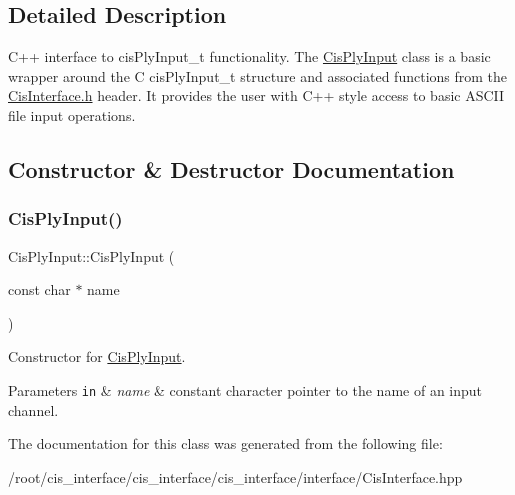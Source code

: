 \subsection{Detailed Description}
C++ interface to cis\+Ply\+Input\+\_\+t functionality. The \mbox{\hyperlink{classCisPlyInput}{Cis\+Ply\+Input}} class is a basic wrapper around the C cis\+Ply\+Input\+\_\+t structure and associated functions from the \mbox{\hyperlink{CisInterface_8h_source}{Cis\+Interface.\+h}} header. It provides the user with C++ style access to basic A\+S\+C\+II file input operations. 

\subsection{Constructor \& Destructor Documentation}
\mbox{\label{classCisPlyInput_aedfc1d48a88199c0eb7b318f423b61c5}} 
\subsubsection{\texorpdfstring{Cis\+Ply\+Input()}{CisPlyInput()}}
{\footnotesize\ttfamily Cis\+Ply\+Input\+::\+Cis\+Ply\+Input (\begin{DoxyParamCaption}\item[{const char $\ast$}]{name }\end{DoxyParamCaption})\hspace{0.3cm}{\ttfamily [inline]}}



Constructor for \mbox{\hyperlink{classCisPlyInput}{Cis\+Ply\+Input}}. 


\begin{DoxyParams}[1]{Parameters}
\mbox{\tt in}  & {\em name} & constant character pointer to the name of an input channel. \\
\hline
\end{DoxyParams}


The documentation for this class was generated from the following file\+:\begin{DoxyCompactItemize}
\item 
/root/cis\+\_\+interface/cis\+\_\+interface/cis\+\_\+interface/interface/Cis\+Interface.\+hpp\end{DoxyCompactItemize}
